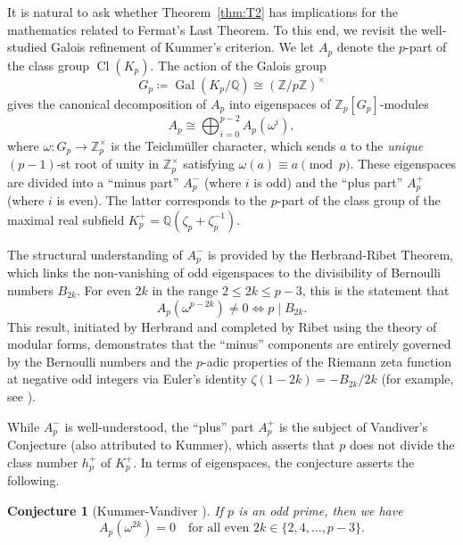 \documentclass[12pt]{amsart}
\theoremstyle{plain}
\newtheorem*{conjecture*}{Conjecture}
\theoremstyle{definition}
\newcommand{\ZZ}{\mathbb{Z}}
\newcommand{\QQ}{\mathbb{Q}}
\DeclareMathOperator{\Gal}{Gal}
\DeclareMathOperator{\Cl}{Cl}
\begin{document}
It is natural to ask whether Theorem~\ref{thm:T2} has implications for the
mathematics related to Fermat's Last Theorem.
To this end, we revisit the well-studied Galois refinement of Kummer's criterion.
We let $A_p$ denote the $p$-part of the class group $\Cl(K_p)$. The action of the Galois group
\[ G_p \coloneq \Gal(K_p/\QQ) \cong (\ZZ/p\ZZ)^\times \]
gives the canonical decomposition of $A_p$ into eigenspaces of $\mathbb{Z}_p[G_p]$-modules
\begin{equation}\label{Eigenspaces}
A_p \cong \bigoplus_{i=0}^{p-2} A_p(\omega^i),
\end{equation}
where $\omega: G_p \to \mathbb{Z}_p^\times$ is the Teichm\"uller character,
which sends $a$ to the \emph{unique} $(p-1)$-st root of unity in $\ZZ_p^\times$
satisfying $\omega(a)\equiv a \pmod p$.
These eigenspaces are divided into a ``minus part'' $A_p^-$ (where $i$ is odd)
and the ``plus part'' $A_p^+$ (where $i$ is even).
The latter corresponds to the $p$-part of the class group of the maximal real
subfield $K_p^+ = \mathbb{Q}(\zeta_p + \zeta_p^{-1})$.

The structural understanding of $A_p^-$ is provided by the Herbrand-Ribet Theorem,
which links the non-vanishing of odd eigenspaces to the divisibility of Bernoulli numbers $B_{2k}$.
For even $2k$ in the range $2 \leq 2k \leq p-3$, this is the statement that
\begin{equation}\label{HSystem}
A_p(\omega^{p-2k}) \neq 0 \iff p \mid B_{2k}.
\end{equation}
This result, initiated by Herbrand \cite{Herbrand} and completed by Ribet
\cite{Ribet1976} using the theory of modular forms,
demonstrates that the ``minus'' components are entirely governed by the
Bernoulli numbers and the $p$-adic properties of the Riemann zeta function at
negative odd integers via Euler's identity $\zeta(1-2k)=-B_{2k}/2k$ (for example, see \cite{IrelandRosen}).

While $A_p^-$ is well-understood,
the ``plus'' part $A_p^+$ is the subject of Vandiver's Conjecture (also attributed to Kummer),
which asserts that $p$ does not divide the class number $h_p^+$ of $K_p^+$.
In terms of eigenspaces, the conjecture asserts the following.

\begin{conjecture*}[Kummer-Vandiver \cite{Kummer1849, Vandiver1929}]
If $p$ is an odd prime, then we have
\[ A_p(\omega^{2k}) = 0 \quad \text{for all even } 2k \in \{2, 4, \dots, p-3\}. \]
\end{conjecture*}
\smallskip
\end{document}
